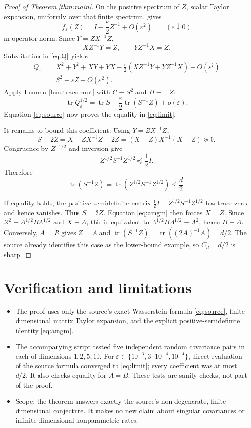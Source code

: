 \documentclass[11pt]{article}
\newcommand{\Tr}{\operatorname{tr}}
\begin{document}
\begin{proof}[Proof of Theorem \ref{thm:main}]
On the positive spectrum of $Z$, scalar Taylor expansion, uniformly over that
finite spectrum, gives
\[
  f_\varepsilon(Z)
  =I-\frac{\varepsilon}{2}Z^{-1}+O(\varepsilon^2)
  \qquad(\varepsilon\downarrow0)
\]
in operator norm.  Since $Y=ZX^{-1}Z$,
\[
  XZ^{-1}Y=Z,
  \qquad
  YZ^{-1}X=Z.
\]
Substitution in \eqref{eq:Q} yields
\begin{align*}
  Q_\varepsilon
  &=X^2+Y^2+XY+YX
    -\frac{\varepsilon}{2}
      \left(XZ^{-1}Y+YZ^{-1}X\right)
    +O(\varepsilon^2)\\
  &=S^2-\varepsilon Z+O(\varepsilon^2).
\end{align*}
Apply Lemma \ref{lem:trace-root} with $C=S^2$ and $H=-Z$:
\[
  \Tr Q_\varepsilon^{1/2}
  =\Tr S-\frac{\varepsilon}{2}\Tr(S^{-1}Z)+o(\varepsilon).
\]
Equation \eqref{eq:source} now proves the equality in \eqref{eq:limit}.

It remains to bound this coefficient.  Using $Y=ZX^{-1}Z$,
\begin{equation}\label{eq:amgm}
  S-2Z
  =X+ZX^{-1}Z-2Z
  =(X-Z)X^{-1}(X-Z)\succeq0.
\end{equation}
Congruence by $Z^{-1/2}$ and inversion give
\[
  Z^{1/2}S^{-1}Z^{1/2}\preceq\frac12I.
\]
Therefore
\[
  \Tr(S^{-1}Z)
  =\Tr\!\left(Z^{1/2}S^{-1}Z^{1/2}\right)
  \le\frac d2.
\]

If equality holds, the positive-semidefinite matrix
$\frac12I-Z^{1/2}S^{-1}Z^{1/2}$ has trace zero and hence vanishes.  Thus
$S=2Z$.  Equation \eqref{eq:amgm} then forces $X=Z$.  Since
$Z^2=A^{1/2}BA^{1/2}$ and $X=A$, this is equivalent to
$A^{1/2}BA^{1/2}=A^2$, hence $B=A$.  Conversely, $A=B$ gives $Z=A$ and
$\Tr(S^{-1}Z)=\Tr((2A)^{-1}A)=d/2$.  The source already identifies this
case as the lower-bound example, so $C_d=d/2$ is sharp.
\end{proof}

\section{Verification and limitations}

\begin{itemize}[leftmargin=*]
\item The proof uses only the source's exact Wasserstein formula
  \eqref{eq:source}, finite-dimensional matrix Taylor expansion, and the
  explicit positive-semidefinite identity \eqref{eq:amgm}.
\item The accompanying script tested five independent random covariance pairs
  in each of dimensions $1,2,5,10$.  For
  $\varepsilon\in\{10^{-3},3\cdot10^{-4},10^{-4}\}$, direct evaluation of
  the source formula converged to \eqref{eq:limit}; every coefficient was at
  most $d/2$.  It also checks equality for $A=B$.  These tests are sanity
  checks, not part of the proof.
\item Scope: the theorem answers exactly the source's non-degenerate,
  finite-dimensional conjecture.  It makes no new claim about singular
  covariances or infinite-dimensional nonparametric rates.
\end{itemize}
\end{document}
